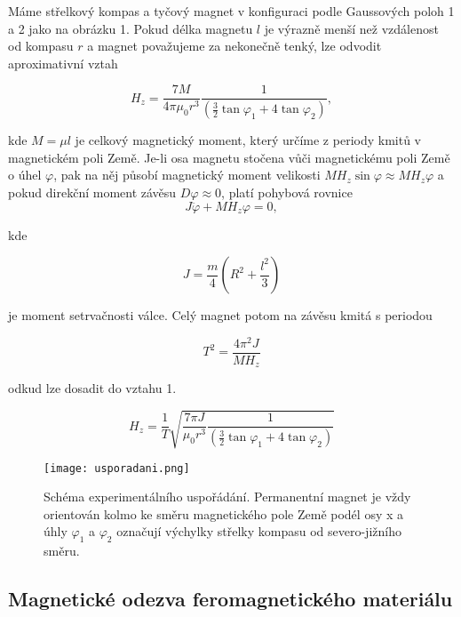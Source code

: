 \documentclass[a4paper,11pt]{article}
\begin{document}
Máme střelkový kompas a tyčový magnet v konfiguraci podle Gaussových poloh 1 a 2 jako na obrázku 1. Pokud délka magnetu \( l \) je výrazně menší než vzdálenost od kompasu \( r \) a magnet považujeme za nekonečně tenký, lze odvodit aproximativní vztah

\begin{equation}
    H_z = \frac{7M}{4 \pi \mu_0 r^3} \frac{1}{ \left( \frac{3}{2}\tan \varphi_1 + 4 \tan \varphi_2  \right) },
\end{equation}

\noindent
kde \( M = \mu l \) je celkový magnetický moment, který určíme z periody kmitů v magnetickém poli Země. Je-li osa magnetu stočena vůči magnetickému poli Země o úhel \( \varphi \), pak na něj působí magnetický moment velikosti
$ M H_z \sin \varphi \approx M H_z \varphi $
a pokud direkční moment závěsu $ D \varphi \approx 0 $, platí pohybová rovnice
\begin{equation}
 J \ddot \varphi + M H_z \varphi = 0 ,
\end{equation}

\noindent
kde 

\begin{equation}
J = \frac{m}{4} \left(R^2 + \frac{l^2}{3} \right)
\end{equation}

\noindent
je moment setrvačnosti válce. Celý magnet potom na závěsu kmitá s periodou

\begin{equation}
T^2 = \frac{4 \pi^2 J}{M H_z}
\end{equation}

\noindent
odkud lze dosadit do vztahu 1.

\begin{equation}
    H_z = \frac{1}{T} \sqrt{ \frac{7 \pi J }{\mu_0 r^3} \frac{1}{ \left( \frac{3}{2}\tan \varphi_1 + 4 \tan \varphi_2  \right) } }
\end{equation}


\begin{figure}[htpb]
    \centering
    \texttt{[image: usporadani.png]}
    \caption{Schéma experimentálního uspořádání. Permanentní magnet je vždy
orientován kolmo ke směru magnetického pole Země podél osy x a úhly \( \varphi_1 \) a \( \varphi_2 \) označují výchylky střelky kompasu od severo-jižního směru. }
\end{figure}

\subsection{Magnetické odezva feromagnetického materiálu}
\end{document}
